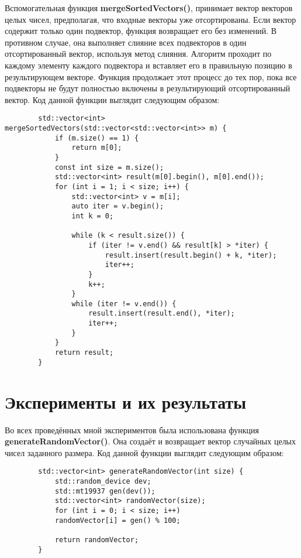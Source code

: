 \documentclass[a4paper, 14pt]{article}
\begin{document}
	Вспомогательная функция \textbf{mergeSortedVectors()}, принимает вектор векторов целых чисел, предполагая, что входные векторы уже отсортированы. Если вектор содержит только один подвектор, функция возвращает его без изменений. В противном случае, она выполняет слияние всех подвекторов в один отсортированный вектор, используя метод слияния. Алгоритм проходит по каждому элементу каждого подвектора и вставляет его в правильную позицию в результирующем векторе. Функция продолжает этот процесс до тех пор, пока все подвекторы не будут полностью включены в результирующий отсортированный вектор. Код данной функции выглядит следующим образом:
	\vspace{-1em}
	\begin{verbatim}
		std::vector<int> mergeSortedVectors(std::vector<std::vector<int>> m) {
			if (m.size() == 1) {
				return m[0];
			}
			const int size = m.size();
			std::vector<int> result(m[0].begin(), m[0].end());
			for (int i = 1; i < size; i++) {
				std::vector<int> v = m[i];
				auto iter = v.begin();
				int k = 0;
				
				while (k < result.size()) {
					if (iter != v.end() && result[k] > *iter) {
						result.insert(result.begin() + k, *iter);
						iter++;
					}
					k++;
				}
				while (iter != v.end()) {
					result.insert(result.end(), *iter);
					iter++;
				}
			}
			return result;
		}
	\end{verbatim}
	\newpage
	\section*{\centering Эксперименты и их результаты}
	
	Во всех проведённых мной экспериментов была использована функция \textbf{generateRandomVector()}. Она создаёт и возвращает вектор случайных целых чисел заданного размера. Код данной функции выглядит следующим образом:
	\vspace{-1em}
	\begin{verbatim}
		std::vector<int> generateRandomVector(int size) {
			std::random_device dev;
			std::mt19937 gen(dev());
			std::vector<int> randomVector(size);
			for (int i = 0; i < size; i++)
			randomVector[i] = gen() % 100;
			
			return randomVector;
		}
	\end{verbatim}
	
\end{document}
